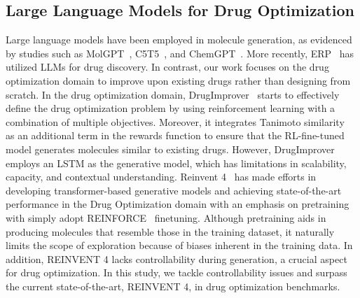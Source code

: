 \subsection{Large Language Models for Drug Optimization}



Large language models have been employed in molecule generation, as evidenced by studies such as MolGPT~\citep{bagal2021molgpt}, C5T5~\citep{rothchild2021c5t5}, and ChemGPT~\citep{frey2023neural}. More recently, ERP~\citep{liu2024erp} has utilized LLMs for drug discovery. In contrast, our work focuses on the drug optimization domain to improve upon existing drugs rather than designing from scratch. In the drug optimization domain, 
DrugImprover~\citep{liu2023drugimprover} starts to effectively define the drug optimization problem by using reinforcement learning with a combination of multiple objectives. Moreover, it integrates Tanimoto similarity~\citep{landrum2016rdkit} as an additional term in the rewards function to ensure that the RL-fine-tuned model generates molecules similar to existing drugs. However, DrugImprover employs an LSTM as the generative model, which has limitations in scalability, capacity, and contextual understanding.
Reinvent 4~\citep{he2021molecular, he2022transformer, loeffler2024reinvent} has made efforts in developing transformer-based generative models and achieving state-of-the-art performance in the Drug Optimization domain with an emphasis on pretraining with simply adopt REINFORCE~\citep{williams1992simple} finetuning. 
Although pretraining aids in producing molecules that resemble those in the training dataset, it naturally limits the scope of exploration because of biases inherent in the training data.
In addition, REINVENT 4 lacks controllability during generation, a crucial aspect for drug optimization. In this study, we tackle controllability issues and surpass the current state-of-the-art, REINVENT 4, in drug optimization benchmarks.





















